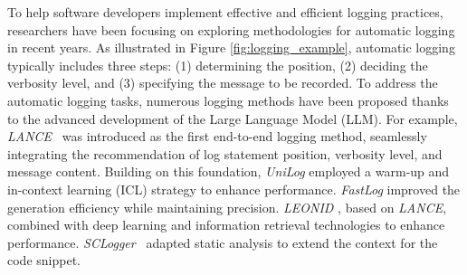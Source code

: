 To help software developers implement effective and efficient logging practices, researchers have been focusing on exploring methodologies for automatic logging in recent years.
As illustrated in Figure \ref{fig:logging_example}, automatic logging typically includes three steps: (1) determining the position, (2) deciding the verbosity level, and (3) specifying the message to be recorded.
To address the automatic logging tasks, numerous logging methods have been proposed thanks to the advanced development of the Large Language Model (LLM).
For example, \textit{LANCE}~\cite{Mastropaolo2022UsingDL} was introduced as the first end-to-end logging method, seamlessly integrating the recommendation of log statement position, verbosity level, and message content.
Building on this foundation,
\textit{UniLog} \cite{Xu2024UniLogAL} employed a warm-up and in-context learning (ICL) strategy to enhance performance. 
\textit{FastLog} \cite{xie2024fastlog} improved the generation efficiency while maintaining precision. 
\textit{LEONID} \cite{Mastropaolo2023LogSG}, based on \textit{LANCE}, combined with deep learning and information retrieval technologies to enhance performance. \textit{SCLogger}~\cite{Li2024GoSC} adapted static analysis to extend the context for the code snippet.


